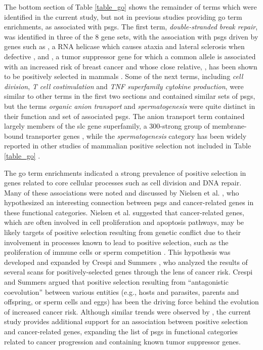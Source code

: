 The bottom section of Table \ref{table_go} shows the remainder of
terms which were identified in the current study, but not in previous
studies providing \ac{go} term enrichments, as associated with
\acp{psg}. The first term, \emph{double-stranded break repair}, was
identified in three of the 8 gene sets, with the association with
\acp{psg} driven by genes such as , a RNA helicase which
causes ataxia and lateral sclerosis when defective
\citep{Suraweera2007}, and , a tumor suppressor gene for
which a common allele is associated with an increased risk of breast
cancer and whose close relative, , has been shown to be
positively selected in mammals \citep{Huttley2000a}. Some of the next
terms, including \emph{cell division}, \emph{T cell costimulation} and
\emph{TNF superfamily cytokine production}, were similar to other
terms in the first two sections and contained similar sets of
\acp{psg}, but the terms \emph{organic anion transport} and
\emph{spermatogenesis} were quite distinct in their function and set
of associated \acp{psg}. The anion transport term contained largely
members of the \ac{slc} gene superfamily, a 300-strong group of
membrane-bound transporter genes \citep{He2009}, while the
\emph{spermatogenesis} category has been widely reported in other
studies of mammalian positive selection not included in Table
\ref{table_go}
\citep{Torgerson2002,Swanson2003,Clark2005,Nielsen2005}.

The \ac{go} term enrichments indicated a strong prevalence of positive
selection in genes related to core cellular processes such as cell
division and DNA repair. Many of these associations were noted and
discussed by Nielsen et al. \citeyearpar{Nielsen2005}, who
hypothesized an interesting connection between \acp{psg} and
cancer-related genes in these functional categories. Nielsen et al.
suggested that cancer-related genes, which are often involved in cell
proliferation and apoptosis pathways, may be likely targets of
positive selection resulting from genetic conflict due to their
involvement in processes known to lead to positive selection, such as
the proliferation of immune cells \citep{Sawyer2005a} or sperm
competition \citep{Torgerson2002,Clark2005}. This hypothesis was
developed and expanded by Crespi and Summers \citeyearpar{Crespi2006},
who analyzed the results of several scans for positively-selected
genes through the lens of cancer risk. Crespi and Summers argued that
positive selection resulting from ``antagonistic coevolution'' between
various entities (e.g., hosts and parasites, parents and offspring, or
sperm cells and eggs) has been the driving force behind the evolution
of increased cancer risk. Although similar trends were observed by
\citet{Nielsen2005}, the current study provides additional support for
an association between positive selection and cancer-related genes,
expanding the list of \acp{psg} in functional categories related to
cancer progression and containing known tumor suppressor genes.

